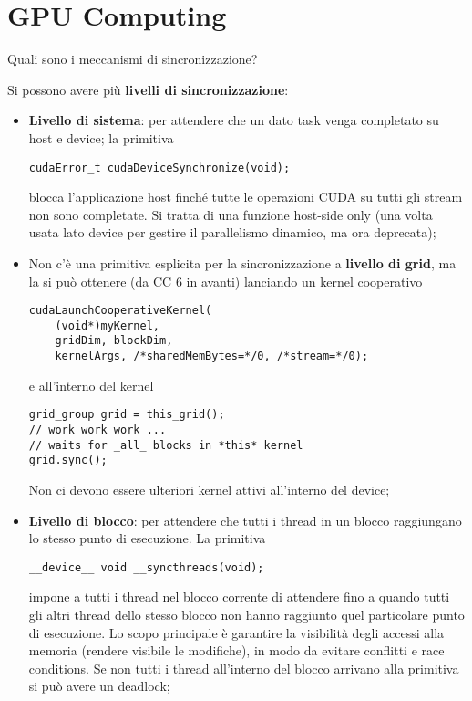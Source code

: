 \documentclass[12pt, answers]{exam}
\begin{document}
\section*{GPU Computing}

\begin{questions}
    
    \question Quali sono i meccanismi di sincronizzazione?
    \begin{solution}
        Si possono avere più \textbf{livelli di sincronizzazione}:
        \begin{itemize}
            \item \textbf{Livello di sistema}: per attendere che un dato task venga completato su host e device; la primitiva
            \begin{verbatim}
cudaError_t cudaDeviceSynchronize(void);
            \end{verbatim}
            blocca l'applicazione host finché tutte le operazioni CUDA su tutti gli stream non sono completate. Si tratta di una funzione host-side only (una volta usata lato device per gestire il parallelismo dinamico, ma ora deprecata);
            
            \item Non c'è una primitiva esplicita per la sincronizzazione a \textbf{livello di grid}, ma la si può ottenere (da CC 6 in avanti) lanciando un kernel cooperativo
            \begin{verbatim}
cudaLaunchCooperativeKernel(
    (void*)myKernel,
    gridDim, blockDim,
    kernelArgs, /*sharedMemBytes=*/0, /*stream=*/0);
            \end{verbatim}
            e all'interno del kernel
            \begin{verbatim}
grid_group grid = this_grid();
// work work work ...
// waits for _all_ blocks in *this* kernel
grid.sync();
            \end{verbatim}
            Non ci devono essere ulteriori kernel attivi all'interno del device;
            
            \item \textbf{Livello di blocco}: per attendere che tutti i thread in un blocco raggiungano lo stesso punto di esecuzione. La primitiva
            \begin{verbatim}
__device__ void __syncthreads(void);
            \end{verbatim}
            impone a tutti i thread nel blocco corrente di attendere fino a quando tutti gli altri thread dello stesso blocco non hanno raggiunto quel particolare punto di esecuzione. Lo scopo principale è garantire la visibilità degli accessi alla memoria (rendere visibile le modifiche), in modo da evitare conflitti e race conditions. Se non tutti i thread all'interno del blocco arrivano alla primitiva si può avere un deadlock;
            

\end{itemize}
\end{solution}
\end{questions}
\end{document}
